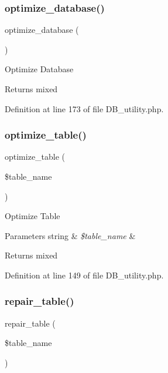 \subsubsection{\texorpdfstring{optimize\_database()}{optimize\_database()}}
{\footnotesize\ttfamily optimize\+\_\+database (\begin{DoxyParamCaption}{ }\end{DoxyParamCaption})}

Optimize Database

\begin{DoxyReturn}{Returns}
mixed 
\end{DoxyReturn}


Definition at line 173 of file D\+B\+\_\+utility.\+php.

\mbox{\label{class_c_i___d_b__utility_a6aed9274f43b64eeee607d172b51529d}} 
\subsubsection{\texorpdfstring{optimize\_table()}{optimize\_table()}}
{\footnotesize\ttfamily optimize\+\_\+table (\begin{DoxyParamCaption}\item[{}]{\$table\+\_\+name }\end{DoxyParamCaption})}

Optimize Table


\begin{DoxyParams}[1]{Parameters}
string & {\em \$table\+\_\+name} & \\
\hline
\end{DoxyParams}
\begin{DoxyReturn}{Returns}
mixed 
\end{DoxyReturn}


Definition at line 149 of file D\+B\+\_\+utility.\+php.

\mbox{\label{class_c_i___d_b__utility_a41a627004d26198c69bf466eef7eaeeb}} 
\subsubsection{\texorpdfstring{repair\_table()}{repair\_table()}}
{\footnotesize\ttfamily repair\+\_\+table (\begin{DoxyParamCaption}\item[{}]{\$table\+\_\+name }\end{DoxyParamCaption})}

